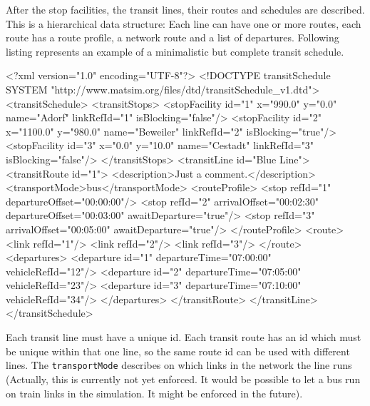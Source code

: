 After the stop facilities, the transit lines, their routes and schedules are described. This is a hierarchical data structure: Each line can have one or more routes, each route has a route profile, a network route and a list of departures. Following listing represents an example of a minimalistic but complete transit schedule.

\begin{xml}
<?xml version="1.0" encoding="UTF-8"?> 
<!DOCTYPE transitSchedule SYSTEM "http://www.matsim.org/files/dtd/transitSchedule_v1.dtd"> 
<transitSchedule> 
   <transitStops> 
      <stopFacility id="1" x="990.0"  y="0.0"   name="Adorf" 
                                                linkRefId="1" isBlocking="false"/> 
      <stopFacility id="2" x="1100.0" y="980.0" name="Beweiler" 
                                                linkRefId="2" isBlocking="true"/> 
      <stopFacility id="3" x="0.0"    y="10.0"  name="Cestadt" 
                                                linkRefId="3" isBlocking="false"/> 
   </transitStops> 
   <transitLine id="Blue Line"> 
      <transitRoute id="1"> 
         <description>Just a comment.</description> 
         <transportMode>bus</transportMode> 
         <routeProfile> 
            <stop refId="1" departureOffset="00:00:00"/> 
            <stop refId="2" arrivalOffset="00:02:30" departureOffset="00:03:00" 
                                                     awaitDeparture="true"/> 
            <stop refId="3" arrivalOffset="00:05:00" awaitDeparture="true"/> 
         </routeProfile> 
         <route> 
            <link refId="1"/> 
            <link refId="2"/> 
            <link refId="3"/> 
         </route> 
         <departures> 
            <departure id="1" departureTime="07:00:00" vehicleRefId="12"/> 
            <departure id="2" departureTime="07:05:00" vehicleRefId="23"/> 
            <departure id="3" departureTime="07:10:00" vehicleRefId="34"/> 
         </departures> 
      </transitRoute> 
   </transitLine> 
</transitSchedule>
\end{xml}

Each transit line must have a unique id. Each transit route has an id which must be unique within that one line, so the same route id can be used with different lines. The \lstinline|transportMode| describes on which links in the network the line runs (Actually, this is currently not yet enforced. It would be possible to let a bus run on train links in the simulation. It might be enforced in the future).


